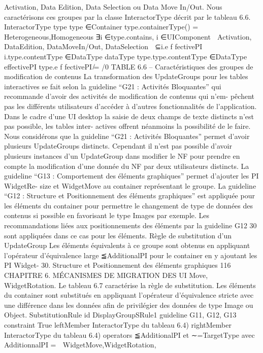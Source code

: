 \documentclass{article}
\begin{document}
Activation, Data Edition, Data Selection ou Data Move In/Out. Nous caractérisons ces groupes par la
classe InteractorType décrit par le tableau 6.6.
InteractorType
type
type ∈{Container}
type.containerType() = {Heterogeneous,Homogeneous}
∃i ∈type.contains, i ∈{UIComponent}

Activation, DataEdition,
DataMoveIn/Out, DataSelection

⊆i.e f fectivePI
i.type.contentType ∈DataType
dataType
type.type.contentType ∈DataType
effectivePI
type.e f fectivePI ̸= /0
TABLE 6.6 – Caractéristiques des groupes de modiﬁcation de contenus
La transformation des UpdateGroups pour les tables interactives se fait selon la guideline “G21 :
Activités Bloquantes” qui recommande d’avoir des activités de modiﬁcation de contenus qui n’em-
pêchent pas les différents utilisateurs d’accéder à d’autres fonctionnalités de l’application. Dans le
cadre d’une UI desktop la saisie de deux champs de texte distincts n’est pas possible, les tables inter-
actives offrent néanmoins la possibilité de le faire. Nous considérons que la guideline “G21 : Activités
Bloquantes” permet d’avoir plusieurs UpdateGroups distincts. Cependant il n’est pas possible d’avoir
plusieurs instances d’un UpdateGroup dans modiﬁer le NF pour prendre en compte la modiﬁcation
d’une donnée du NF par deux utilisateurs distincts.
La guideline “G13 : Comportement des éléments graphiques” permet d’ajouter les PI WidgetRe-
size et WidgetMove au container représentant le groupe.
La guideline “G12 : Structure et Positionnement des éléments graphiques” est appliquée pour les
éléments du container pour permettre le changement de type de données des contenus si possible en
favorisant le type Images par exemple. Les recommandations liées aux positionnements des éléments
par la guideline G12 30 sont appliquées dans ce cas pour les éléments.
Règle de substitution d’un UpdateGroup
Les éléments équivalents à ce groupe sont obtenus en
appliquant l’opérateur d’équivalence large ≦AdditionalPI pour le container en y ajoutant les PI Widget-
30. Structure et Positionnement des éléments graphiques
116
CHAPITRE 6. MÉCANISMES DE MIGRATION DES UI
Move, WidgetRotation. Le tableau 6.7 caractérise la règle de substitution. Les éléments du container
sont substitués en appliquant l’opérateur d’équivalence stricte avec une différence dans les données
aﬁn de privilégier des données de type Image ou Object.
SubstitutionRule
id
DisplayGroupSRule1
guideline
G11, G12, G13
constraint
True
leftMember
InteractorType du tableau 6.4)
rightMember
InteractorType du tableau 6.4)
operators
≦AdditionalPI et ∼=TargetType
avec AdditionnalPI =
 WidgetMove,WidgetRotation,
\end{document}
